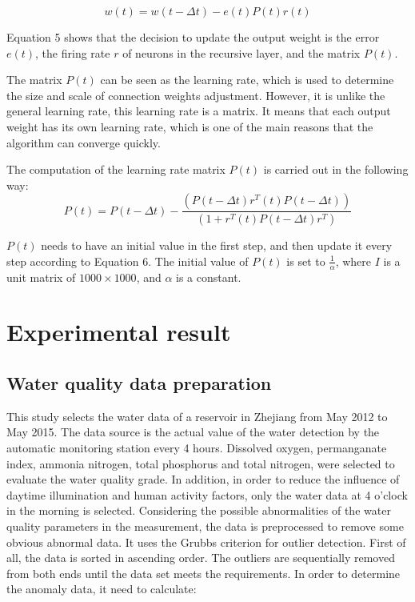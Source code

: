 \documentclass[runningheads]{llncs}
\begin{document}
\begin{equation}
w(t)= w(t -\Delta t)  - e(t)P(t)r(t)
\end{equation}

Equation 5 shows that the decision to update the output weight is the 
error $e(t)$, the firing rate $r$ of neurons in  the recursive layer, 
and the matrix $P(t)$.

The  matrix $P(t)$ can be seen as the learning rate, which is used 
to determine the size and scale of connection weights adjustment. However, it is
unlike the general learning rate, this learning rate is a matrix. 
It means that each output weight has its own learning rate, 
which is one of the main reasons that the algorithm can converge quickly.

The computation of the learning rate matrix $P(t)$ is carried out in the following way:
\begin{equation}
P(t)  = P(t-\Delta t)-  \frac{(P(t-\Delta t) r^T (t)P(t-\Delta t))}{(1+r^T (t)P(t-\Delta t) r^T )}
\end{equation}

$P(t)$ needs to have an initial value in the first step,  
and then update it every step according to Equation 6. 
The initial value of $P(t)$ is set to $\frac{1}{\alpha}$, where $I$ is a unit matrix of $1000\times 1000$,
and $\alpha$ is a constant.


\section{Experimental result}
\subsection{Water quality data preparation}
This study selects the water data of a reservoir in Zhejiang 
from May 2012 to May 2015. The data source is the actual value of 
the water detection by the automatic monitoring station every 4 hours.
Dissolved oxygen, permanganate index, ammonia nitrogen, total phosphorus
and total nitrogen, were selected to evaluate the water quality grade. 
In addition, in order to reduce the influence of daytime illumination 
and human activity factors, only the water data at 4 o'clock 
in the morning  is selected. 
Considering the possible abnormalities of the water quality 
parameters in the measurement, the data is preprocessed to remove 
some obvious abnormal data. It uses the Grubbs criterion for outlier 
detection. First of all, the data is sorted in ascending order. 
The outliers are sequentially removed from both ends until the data 
set meets the requirements. In order to determine the anomaly data, 
it need to calculate:
\end{document}
